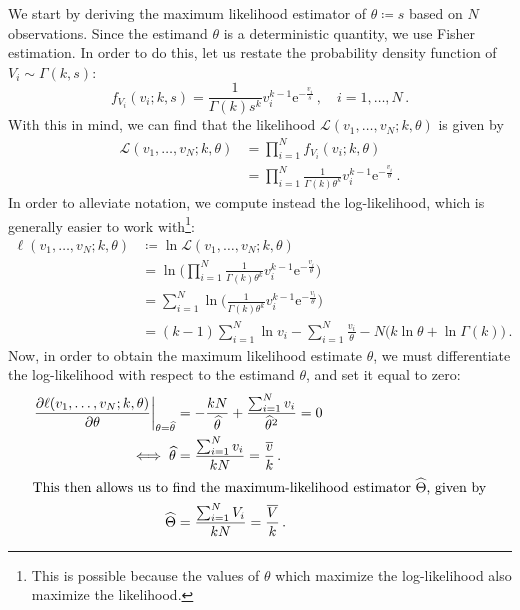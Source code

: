 \documentclass[final]{aomart}
\newtheorem[{}\it]{thm}{Theorem}[section]
\theoremstyle{definition}
\newtheorem*[{}\it]{notation}{Notation}
\numberwithin{equation}{section}
\newcommand{\wh}{\widehat}
\newcommand{\like}{\mathcal{L}} %
\newcommand{\e}{\mathrm{e}} %
\newcommand{\pdf}{f} %
\newcommand{\htheta}{\wh{\theta}} %
\newcommand{\hTheta}{\wh{\Theta}} %
\newcommand{\eval}[2][\right]{\relax
  \ifx#1\right\relax \left.\fi#2#1\rvert}
\begin{document}
We start by deriving the maximum likelihood estimator of \(\theta \coloneqq s\) based on \(N\) observations.
Since the estimand $\theta$ is a deterministic quantity, we use Fisher estimation. %
In order to do this, let us restate the probability density function of \(V_i \sim \Gamma(k, s)\):
\begin{equation}
\pdf_{V_i}(v_i; k, s) = \frac{1}{\Gamma(k) s^k} v_i^{k-1} \e^{-\frac{v_i}{s}}\,, \quad i = 1, \ldots, N\,.
\end{equation}
With this in mind, we can find that the likelihood \(\like(v_1, \ldots, v_N; k, \theta)\) is given by
\begin{align}
\like(v_1, \ldots, v_N; k, \theta) &= \prod_{i=1}^{N} \pdf_{V_i}(v_i; k,\theta)\\
&= \prod_{i=1}^{N} \frac{1}{\Gamma(k) \theta^k} v_i^{k-1} \e^{-\frac{v_i}{\theta}}\,.
\end{align}
In order to alleviate notation, we compute instead the log-likelihood, which is generally easier to work with\footnote{This is possible because the values of \(\theta\) which maximize the log-likelihood also maximize the likelihood.}:
\begin{align}
\ell(v_1, \ldots, v_N; k, \theta) &\coloneqq \ln \like(v_1, \ldots, v_N; k, \theta)\\
&= \ln\Bigg(\prod_{i=1}^{N} \frac{1}{\Gamma(k) \theta^k} v_i^{k-1} \e^{-\frac{v_i}{\theta}} \Bigg)\\
& = \sum_{i=1}^{N} \ln\Bigg(\frac{1}{\Gamma(k) \theta^k} v_i^{k-1} \e^{-\frac{v_i}{\theta}}\Bigg)\\
& = (k-1) \sum_{i=1}^{N}\ln v_i - \sum_{i=1}^{N} \frac{v_i}{\theta} - N \big(k \ln \theta + \ln \Gamma(k)\big)\,.
\end{align}
Now, in order to obtain the maximum likelihood estimate \(\htheta\), we must differentiate the log-likelihood with respect to the estimand \(\theta\), and set it equal to zero:
\begin{align}
\eval{\frac{\partial \ell(v_1, \ldots, v_N; k, \theta)}{\partial \theta}}_{\theta = \htheta} &= -\frac{kN}{\htheta} + \frac{\sum_{i=1}^{N} v_i}{\htheta^2} = 0\\
\iff \htheta &= \frac{\sum_{i=1}^{N} v_i}{kN} = \frac{\widebar{v}}{k}\,.\\
\intertext{This then allows us to find the maximum-likelihood estimator \(\hTheta\), given by}
\hTheta &= \frac{\sum_{i=1}^{N} V_i}{kN} = \frac{\widebar{V}}{k}\,.\label{eq:mlestimator}
\end{align}
\end{document}
